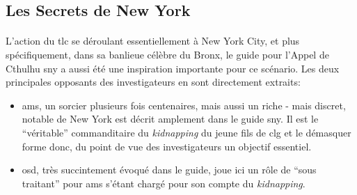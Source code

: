 \subsection{Les Secrets de New York}
\paragraph{} L'action du \gls{tlc} se déroulant essentiellement à New York City, et plus spécifiquement, dans sa banlieue célèbre 
du Bronx, le guide pour l'Appel de Cthulhu \gls{sny} a aussi été une inspiration importante pour ce scénario. Les deux principales
opposants des investigateurs en sont directement extraits:
\begin{itemize}
 \item \gls{ams}, un sorcier plusieurs fois centenaires, mais aussi un riche - mais discret, notable de New York est décrit amplement 
dans le guide \gls{sny}. Il est le ``véritable'' commanditaire du \emph{kidnapping} du jeune fils de \gls{clg} et le démasquer forme 
donc, du point de vue des investigateurs un objectif essentiel.
 \item \gls{osd}, très succintement évoqué dans le guide, joue ici un rôle de ``sous traitant'' pour \gls{ams} s'étant chargé pour 
son compte du \emph{kidnapping}.
\end{itemize}

